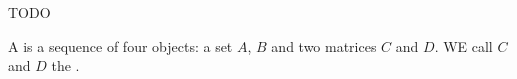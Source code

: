 
\sbasic



\sstart
{}


TODO


A  is
a sequence of four objects:
a set $A$, $B$ and two matrices
$C$ and $D$.
WE call $C$ and $D$ the
.
\strats
